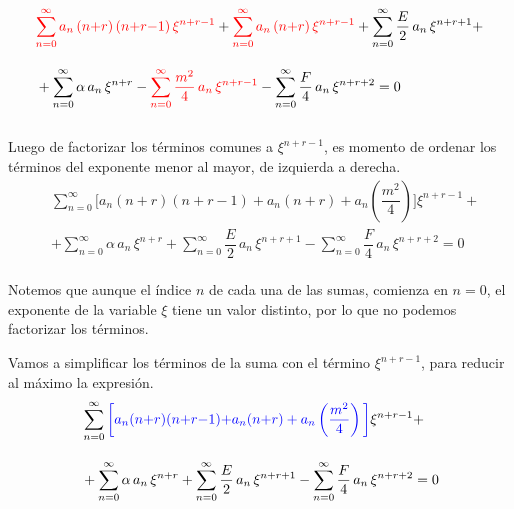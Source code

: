 \begin{align*}
&{} \textcolor{red}{\sum_{n=0}^{\infty} a_{n} \, (n {+} r) \, (n {+} r {-} 1) \, \xi^{n{+}r{-}1}} + \textcolor{red}{\sum_{n=0}^{\infty} a_{n} \, (n {+} r) \, \xi^{n{+}r{-}1}} + \sum_{n=0}^{\infty} \dfrac{E}{2} \, a_{n} \, \xi^{n{+}r{+}1} + \\[1em]
&+ \sum_{n=0}^{\infty} \alpha \, a_{n} \, \xi^{n{+}r} - \textcolor{red}{\sum_{n=0}^{\infty}  \dfrac{m^{2}}{4} \, a_{n} \, \xi^{n{+}r{-}1}} - \sum_{n=0}^{\infty} \dfrac{F}{4} \, a_{n} \, \xi^{n{+}r{+}2} = 0
\end{align*}
\\
Luego de factorizar los términos comunes a $\xi^{n+r-1}$, es momento de ordenar los términos del exponente menor al mayor, de izquierda a derecha.
\begin{align*}
&{} \sum_{n=0}^{\infty} \bigg[ a_{n} (n {+} r) (n {+} r {-} 1) {+} a_{n} (n {+} r) + a_{n} \left( \dfrac{m^{2}}{4} \right) \bigg] \xi^{n+r-1} + \\[0.5em] 
&{+}  \sum_{n=0}^{\infty} \alpha \, a_{n} \, \xi^{n+r} {+}  \sum_{n=0}^{\infty} \dfrac{E}{2} \, a_{n} \, \xi^{n+r+1} {-} \sum_{n=0}^{\infty} \dfrac{F}{4} \, a_{n} \, \xi^{n+r+2} = 0
\end{align*}
\\
Notemos que aunque el índice $n$ de cada una de las sumas, comienza en $n=0$, el exponente de la variable $\xi$ tiene un valor distinto, por lo que no podemos factorizar los términos.
\par
Vamos a simplificar los términos de la suma con el término  $\xi^{n+r-1}$, para reducir al máximo la expresión.
\begin{align*}
&{} \sum_{n=0}^{\infty} \textcolor{blue}{\bigg[ a_{n} (n {+} r) (n {+} r {-} 1) {+} a_{n} (n {+} r) + a_{n} \left( \dfrac{m^{2}}{4} \right) \bigg]} \xi^{n+r-1} + \\[1em] 
&+ \sum_{n=0}^{\infty} \alpha \, a_{n} \, \xi^{n+r} + \sum_{n=0}^{\infty} \dfrac{E}{2} \, a_{n} \, \xi^{n+r+1} - \sum_{n=0}^{\infty} \dfrac{F}{4} \, a_{n} \, \xi^{n+r+2} = 0
\end{align*}
